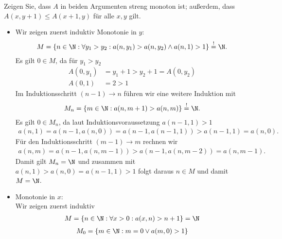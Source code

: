 
\begin{exercise}[208]

Zeigen Sie, dass $A$ in beiden Argumenten streng monoton ist; außerdem, dass
$A(x,y+1) \leq A(x+1,y)$ für alle $x,y$ gilt.

\end{exercise}


\begin{solution}
\phantom{}
\begin{itemize}
  \item Wir zeigen zuerst induktiv Monotonie in $y$:
  \begin{align*}
    M = \{n \in \N: \forall y_1 > y_2: a(n,y_1) > a(n,y_2) \land a(n,1) > 1\} \stackrel{!}{=} \N.
  \end{align*}
  Es gilt $0 \in M$, da für $y_1 > y_2$
  \begin{align*}
    A(0,y_1) &= y_1 + 1 > y_2 + 1 = A(0,y_2) \\
    A(0,1) &= 2 > 1
  \end{align*}
  Im Induktionsschritt $(n-1) \rightarrow n$ führen wir eine weitere Induktion mit
  \begin{align*}
    M_n = \{m \in \N: a(n,m+1) > a(n,m)\} \stackrel{!}{=} \N.
  \end{align*}
  Es gilt $0 \in M_n$, da laut Induktionsvoraussetzung $a(n-1,1) > 1$
  \begin{align*}
    a(n,1) = a(n-1,a(n,0)) = a(n-1,a(n-1,1)) > a(n-1,1) = a(n,0).
  \end{align*}
  Für den Induktionsschritt $(m-1) \rightarrow m $ rechnen wir
  \begin{align*}
    a(n,m) = a(n-1,a(n,m-1)) > a(n-1,a(n,m-2)) = a(n,m-1).
  \end{align*}
  Damit gilt $M_n = \N$ und zusammen mit $a(n,1) > a(n,0) = a(n-1,1) > 1$ folgt daraus
  $n \in M$ und damit $M = \N$.
  \item Monotonie in $x$: \\
  Wir zeigen zuerst induktiv
  \begin{align}\label{hilf}
    M = \{n \in \N: \forall x > 0: a(x,n) > n + 1\} = \N
  \end{align}
  \begin{align*}
    M_0 =  \{m \in \N: m = 0 \lor a(m,0) > 1\}
  \end{align*}

\end{itemize}
\end{solution}
